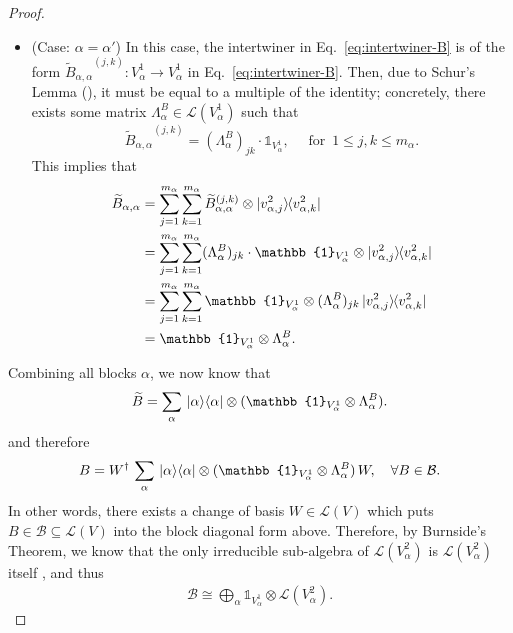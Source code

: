 \begin{proof}
\begin{itemize}
    \item (Case: $\alpha = \alpha'$) In this case, the intertwiner in Eq.~\eqref{eq:intertwiner-B} is of the form ${\widetilde{B}_{\alpha,\alpha}}^{(j,k)}:V_\alpha^1 \rightarrow V_{\alpha}^1$ in Eq.~\eqref{eq:intertwiner-B}. Then, due to Schur's Lemma (), it must be equal to a multiple of the identity; concretely, there exists some matrix $\Lambda_\alpha^B \in \mathcal{L}(V_\alpha^1)$ such that
    $$
    {\widetilde{B}_{\alpha,\alpha}}^{(j,k)} = (\Lambda_\alpha^B)_{jk} \cdot \mathbb{1}_{V_\alpha^1}, \quad \text{ for } \, 1 \leq j,k \leq m_\alpha.
    $$
\noindent This implies that
    \begin{align}
\widetilde{B}_{\alpha,\alpha} &= \sum_{j=1}^{m_\alpha} \sum_{k=1}^{m_{\alpha}}   {\widetilde{B}_{\alpha,\alpha}}^{(j,k)} \otimes \ket{v_{\alpha,j}^2} \hspace{-1mm}\bra{v_{\alpha,k}^2}\\
&=\sum_{j=1}^{m_\alpha} \sum_{k=1}^{m_{\alpha}}   (\Lambda_\alpha^B)_{jk} \cdot \mathbb{1}_{V_\alpha^1} \otimes \ket{v_{\alpha,j}^2} \hspace{-1mm}\bra{v_{\alpha,k}^2}\\
&=\sum_{j=1}^{m_\alpha} \sum_{k=1}^{m_{\alpha}}  \mathbb{1}_{V_\alpha^1} \otimes (\Lambda_\alpha^B)_{jk} \ket{v_{\alpha,j}^2} \hspace{-1mm}\bra{v_{\alpha,k}^2}\\
&= \mathbb{1}_{V_\alpha^1} \otimes \Lambda_\alpha^B.
\end{align}
\end{itemize}
Combining all blocks $\alpha$, we now know that
\begin{align}
\widetilde{B} = \sum_\alpha  \,\proj{\alpha} \otimes (\mathbb{1}_{V_\alpha^1} \otimes \Lambda_\alpha^B).   
\end{align}
and therefore
\begin{align}
B = W^\dag \, \sum_\alpha  \,\proj{\alpha} \otimes (\mathbb{1}_{V_\alpha^1} \otimes \Lambda_\alpha^B) \, W, \quad \forall B \in \mathcal{B}.   
\end{align}
In other words, there exists a change of basis $W \in \mathcal{L}(V)$ which puts $B \in \mathcal{B} \subseteq \mathcal{L}(V)$ into the block diagonal form above. Therefore, by Burnside's Theorem, we know that the only irreducible sub-algebra of $\mathcal{L}(V_\alpha^2)$ is $\mathcal{L}(V_\alpha^2)$ itself , and thus
\begin{align}
\mathcal{B} \cong \bigoplus_{\alpha} \mathbb{1}_{V^1_\alpha} \otimes \mathcal{L}(V^2_\alpha).    
\end{align}
\end{proof}

